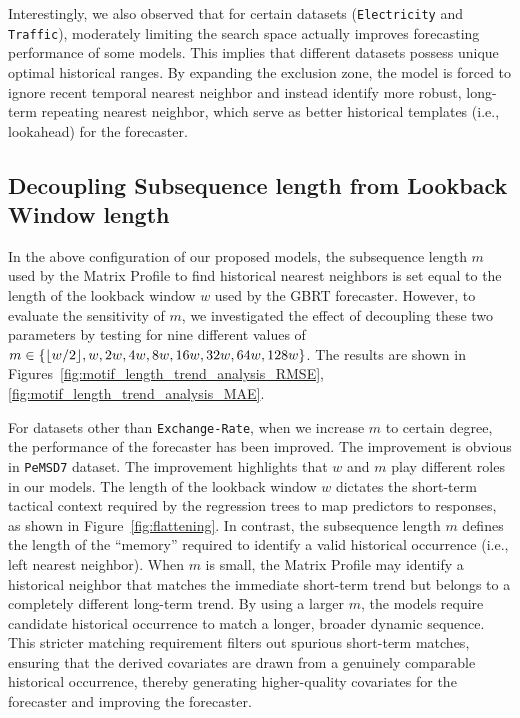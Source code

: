 Interestingly, we also observed that for certain datasets (\texttt{Electricity} and \texttt{Traffic}), moderately limiting the search space actually improves forecasting performance of some models. 
This implies that different datasets possess unique optimal historical ranges. 
By expanding the exclusion zone, the model is forced to ignore recent temporal nearest neighbor and instead identify more robust, long-term repeating nearest neighbor, which serve as better historical templates (i.e., lookahead) for the forecaster.

\subsection{Decoupling Subsequence length from Lookback Window length}




In the above configuration of our proposed models, the subsequence length $m$ used by the Matrix Profile to find historical nearest neighbors is set equal to the length of the lookback window $w$ used by the GBRT forecaster. 
However, to evaluate the sensitivity of $m$, we investigated the effect of decoupling these two parameters by testing for nine different values of $m \in \{ \lfloor w/2\rfloor, w, 2w, 4w, 8w, 16w, 32w, 64w, 128w \}$.
The results are shown in Figures~\ref{fig:motif_length_trend_analysis_RMSE}, \ref{fig:motif_length_trend_analysis_MAE}.

For datasets other than \texttt{Exchange-Rate}, when we increase $m$ to certain degree, the performance of the forecaster has been improved.
The improvement is obvious in \texttt{PeMSD7} dataset.
%
The improvement highlights that $w$ and $m$ play different roles in our models. 
The length of the lookback window $w$ dictates the short-term tactical context required by the regression trees to map predictors to responses, as shown in Figure~\ref{fig:flattening}. 
%
In contrast, the subsequence length $m$ defines the length of the ``memory'' required to identify a valid historical occurrence (i.e., left nearest neighbor). 
When $m$ is small, the Matrix Profile may identify a historical neighbor that matches the immediate short-term trend but belongs to a completely different long-term trend.
%
By using a larger $m$, the models require candidate historical occurrence to match a longer, broader dynamic sequence. 
This stricter matching requirement filters out spurious short-term matches, ensuring that the derived covariates are drawn from a genuinely comparable historical occurrence, thereby generating higher-quality covariates for the forecaster and improving the forecaster.